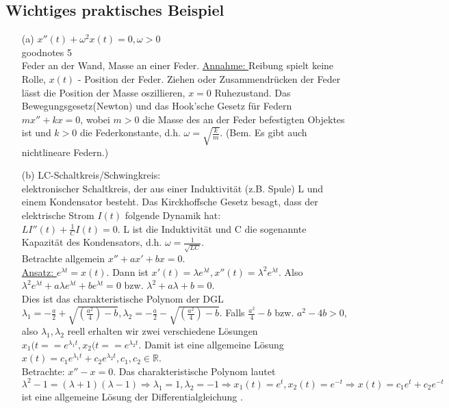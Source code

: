 \documentclass[12pt,a4paper]{article}
\newcommand{\DGL}{Differentialgleichung }
\newcommand{\Lsg}{Lösung }
\begin{document}
\subsection{Wichtiges praktisches Beispiel}
\begin{itemize}
\item[(a)] $x''(t) + \omega^2x(t) = 0, \omega > 0$ \\ goodnotes 5 \\
Feder an der Wand, Masse an einer Feder. \underline{Annahme: } Reibung spielt keine Rolle, $x(t)$ - Position der Feder. Ziehen oder Zusammendrücken der Feder lässt die Position der Masse oszillieren, $x=0$ Ruhezustand. Das Bewegungsgesetz(Newton) und das Hook'sche Gesetz für Federn $mx''+kx = 0$, wobei $m>0$ die Masse des an der Feder befestigten Objektes ist und $k>0$ die Federkonstante, d.h. $\omega = \sqrt{\frac{k}{m}}$. (Bem. Es gibt auch nichtlineare Federn.)
\item[(b)] LC-Schaltkreis/Schwingkreis: \\
elektronischer Schaltkreis, der aus einer Induktivität (z.B. Spule) L und einem Kondensator besteht. Das Kirckhoffsche Gesetz besagt, dass der elektrische Strom $I(t)$ folgende Dynamik hat: \\
$LI''(t) + \frac{1}{C}I(t) = 0$. L ist die Induktivität und C die sogenannte Kapazität des Kondensators, d.h. $\omega = \frac{1}{\sqrt{LC}}$. \\
Betrachte allgemein $x''+ax'+bx=0$. \\
 \underline{Ansatz: } $e^{\lambda t} = x(t)$. Dann ist $x'(t) = \lambda e^{\lambda t}, x''(t) = \lambda^2e^{\lambda t}$. Also $\lambda^2e^{\lambda t}+a \lambda e^{\lambda t} + b e^{\lambda t} = 0$ bzw. $\lambda^2 + a \lambda + b = 0$. \\
Dies ist das charakteristische Polynom der DGL $\lambda_1 = -\frac{a}{2} + \sqrt{(\frac{a^2}{4})-b}, \lambda_2 = -\frac{a}{2} - \sqrt{(\frac{a^2}{4})-b}$. Falls $\frac{a^2}{4}-b$ bzw. $a^2-4b >0$, also $\lambda_1, \lambda_2$ reell erhalten wir zwei verschiedene Lösungen $x_1(t= = e^{\lambda_1 t}, x_2(t= = e^{\lambda_2 t}$. Damit ist eine allgemeine Lösung $x(t) = c_1e^{\lambda_1 t} + c_2 e^{\lambda_2 t}, c_1, c_2 \in \mathbb{R}$. \\
Betrachte: $x''-x=0$. Das charakteristische Polynom lautet $\lambda^2-1=(\lambda+1)(\lambda-1) \Rightarrow \lambda_1 = 1, \lambda_2 = -1 \Rightarrow x_1(t) = e^t, x_2(t) = e^{-t} \Rightarrow x(t) = c_1e^t + c_2e^{-t}$ ist eine allgemeine \Lsg der \DGL. 
\end{itemize}
\end{document}
